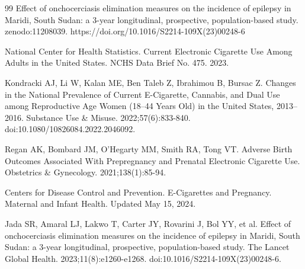 \documentclass[11pt]{article}
\begin{document}
\begin{thebibliography}{99}
Effect of onchocerciasis elimination measures on the incidence of epilepsy in Maridi, South Sudan: a 3-year longitudinal, prospective, population-based study. zenodo:11208039. https://doi.org/10.1016/S2214-109X(23)00248-6

National Center for Health Statistics. Current Electronic Cigarette Use Among Adults in the United States. NCHS Data Brief No. 475. 2023.

Kondracki AJ, Li W, Kalan ME, Ben Taleb Z, Ibrahimou B, Bursac Z. Changes in the National Prevalence of Current E-Cigarette, Cannabis, and Dual Use among Reproductive Age Women (18–44 Years Old) in the United States, 2013–2016. Substance Use \& Misuse. 2022;57(6):833-840. doi:10.1080/10826084.2022.2046092.

Regan AK, Bombard JM, O'Hegarty MM, Smith RA, Tong VT. Adverse Birth Outcomes Associated With Prepregnancy and Prenatal Electronic Cigarette Use. Obstetrics \& Gynecology. 2021;138(1):85-94.

Centers for Disease Control and Prevention. E-Cigarettes and Pregnancy. Maternal and Infant Health. Updated May 15, 2024.

Jada SR, Amaral LJ, Lakwo T, Carter JY, Rovarini J, Bol YY, et al. Effect of onchocerciasis elimination measures on the incidence of epilepsy in Maridi, South Sudan: a 3-year longitudinal, prospective, population-based study. The Lancet Global Health. 2023;11(8):e1260-e1268. doi:10.1016/S2214-109X(23)00248-6.

\end{thebibliography}
\end{document}
